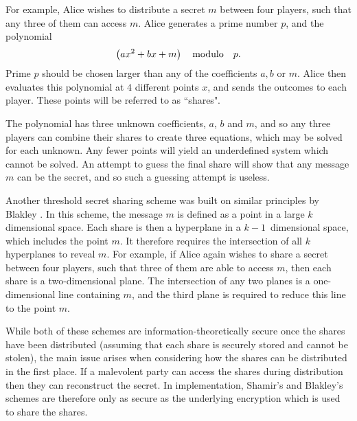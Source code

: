 For example, Alice wishes to distribute a secret $m$ between four players, such that any three of them can access $m$. Alice generates a prime number $p$, and the polynomial 
\begin{equation}
\left( a x^2 + b x + m \right) \qq{modulo} p.
\end{equation}
Prime $p$ should be chosen larger than any of the coefficients $a, b$ or $m$. Alice then evaluates this polynomial at $4$ different points $x$, and sends the outcomes to each player. These points will be referred to as ``shares". %

The polynomial has three unknown coefficients, $a$, $b$ and $m$, and so any three players can combine their shares to create three equations, which may be solved for each unknown. Any fewer points will yield an underdefined system which cannot be solved. An attempt to guess the final share will show that any message $m$ can be the secret, and so such a guessing attempt is useless.

Another threshold secret sharing scheme was built on similar principles by Blakley \cite{Blakley1979}. In this scheme, the message $m$ is defined as a point in a large $k$ dimensional space. Each share is then a hyperplane in a $k-1$~dimensional space, which includes the point $m$. It therefore requires the intersection of all $k$ hyperplanes to reveal $m$. For example, if Alice again wishes to share a secret between four players, such that three of them are able to access $m$, then each share is a two-dimensional plane. The intersection of any two planes is a one-dimensional line containing $m$, and the third plane is required to reduce this line to the point $m$.

While both of these schemes are information-theoretically secure once the shares have been distributed (assuming that each share is securely stored and cannot be stolen), the main issue arises when considering how the shares can be distributed in the first place. If a malevolent party can access the shares during distribution then they can reconstruct the secret. In implementation, Shamir's and Blakley's schemes are therefore only as secure as the underlying encryption which is used to share the shares.

%

